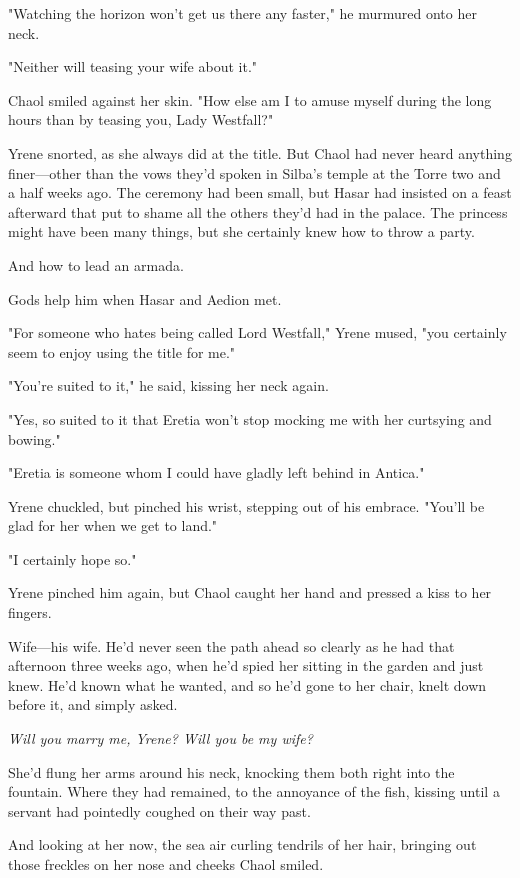 "Watching the horizon won't get us there any faster," he murmured onto her neck.

"Neither will teasing your wife about it."

Chaol smiled against her skin. "How else am I to amuse myself during the long hours than by teasing you, Lady Westfall?"

Yrene snorted, as she always did at the title. But Chaol had never heard anything finer---other than the vows they'd spoken in Silba's temple at the Torre two and a half weeks ago. The ceremony had been small, but Hasar had insisted on a feast afterward that put to shame all the others they'd had in the palace. The princess might have been many things, but she certainly knew how to throw a party.

And how to lead an armada.

Gods help him when Hasar and Aedion met.

"For someone who hates being called Lord Westfall," Yrene mused, "you certainly seem to enjoy using the title for me."

"You're suited to it," he said, kissing her neck again.

"Yes, so suited to it that Eretia won't stop mocking me with her curtsying and bowing."

"Eretia is someone whom I could have gladly left behind in Antica."

Yrene chuckled, but pinched his wrist, stepping out of his embrace. "You'll be glad for her when we get to land."

"I certainly hope so."

Yrene pinched him again, but Chaol caught her hand and pressed a kiss to her fingers.

Wife---his wife. He'd never seen the path ahead so clearly as he had that afternoon three weeks ago, when he'd spied her sitting in the garden and just  knew. He'd known what he wanted, and so he'd gone to her chair, knelt down before it, and simply asked.

\emph{Will you marry me, Yrene? Will you be my wife?}

She'd flung her arms around his neck, knocking them both right into the fountain. Where they had remained, to the annoyance of the fish, kissing until a servant had pointedly coughed on their way past.

And looking at her now, the sea air curling tendrils of her hair, bringing out those freckles on her nose and cheeks  Chaol smiled.

